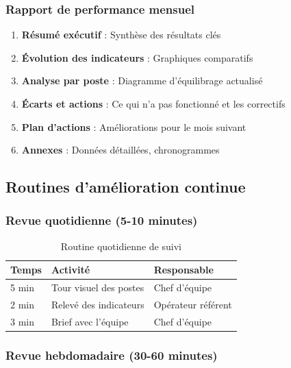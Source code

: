 \documentclass[12pt,a4paper]{article}
\newenvironment{methodbox}[1]
  {\begin{tcolorbox}[colback=blue!5!white, colframe=methodcolor, title=#1]\small}
  {\end{tcolorbox}}
\begin{document}
\subsubsection{Rapport de performance mensuel}

\begin{methodbox}{Structure du rapport mensuel}
\begin{enumerate}
    \item \textbf{Résumé exécutif} : Synthèse des résultats clés
    \item \textbf{Évolution des indicateurs} : Graphiques comparatifs
    \item \textbf{Analyse par poste} : Diagramme d'équilibrage actualisé
    \item \textbf{Écarts et actions} : Ce qui n'a pas fonctionné et les correctifs
    \item \textbf{Plan d'actions} : Améliorations pour le mois suivant
    \item \textbf{Annexes} : Données détaillées, chronogrammes
\end{enumerate}
\end{methodbox}

\subsection{Routines d'amélioration continue}

\subsubsection{Revue quotidienne (5-10 minutes)}

\begin{table}[H]
\centering
\begin{tabular}{|p{3cm}|p{4cm}|p{5cm}|}
\hline
\textbf{Temps} & \textbf{Activité} & \textbf{Responsable} \\
\hline
5 min & Tour visuel des postes & Chef d'équipe \\
\hline
2 min & Relevé des indicateurs & Opérateur référent \\
\hline
3 min & Brief avec l'équipe & Chef d'équipe \\
\hline
\end{tabular}
\caption{Routine quotidienne de suivi}
\end{table}

\subsubsection{Revue hebdomadaire (30-60 minutes)}
\end{document}
